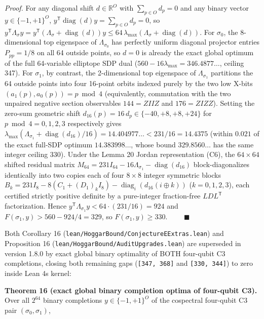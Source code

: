 \documentclass[11pt,a4paper]{article}
\newcommand{\lt}{<}
\newcommand{\gt}{>}
\begin{document}
\emph{Proof.} For any diagonal shift \(d\in\mathbb R^O\) with \(\sum_{p\in O} d_p = 0\) and any binary vector
\(y\in\{-1,+1\}^O\), \(y^{\mathsf T}\operatorname{diag}(d)y = \sum_{p\in O} d_p = 0\), so
\(y^{\mathsf T}\Lambda_\sigma y = y^{\mathsf T}(\Lambda_\sigma + \operatorname{diag}(d))y \le 64\,\lambda_{\max}(\Lambda_\sigma + \operatorname{diag}(d))\).
For \(\sigma_0\), the 8-dimensional top eigenspace of \(\Lambda_{\sigma_0}\) has perfectly uniform diagonal
projector entries \(P_{pp} = 1/8\) on all 64 outside points, so \(d=0\) is already the exact global optimum of
the full 64-variable elliptope SDP dual (\(560 - 16\lambda_{\max} = 346.4877\ldots\), ceiling 347). For
\(\sigma_1\), by contrast, the 2-dimensional top eigenspace of \(\Lambda_{\sigma_1}\) partitions the 64
outside points into four 16-point orbits indexed purely by the two low X-bits
\((a_1(p), a_0(p)) = p \bmod 4\) (equivalently, commutation with the two unpaired negative section
observables \(144 = ZIIZ\) and \(176 = ZIZZ\)). Setting the zero-sum geometric shift
\(d_{16}(p) = 16\,d_p \in \{-40, +8, +8, +24\}\) for \(p \bmod 4 = 0, 1, 2, 3\) respectively gives
\(\lambda_{\max}(\Lambda_{\sigma_1} + \operatorname{diag}(d_{16})/16) = 14.404977\ldots \lt 231/16 = 14.4375\)
(within \(0.021\) of the exact full-SDP optimum \(14.383998\ldots\), whose bound \(329.8560\ldots\) has the
same integer ceiling 330). Under the Lemma 20 Jordan representation (C6), the \(64\times 64\) shifted
residual matrix \(M_{64} = 231 I_{64} - 16\Lambda_{\sigma_1} - \operatorname{diag}(d_{16})\)
block-diagonalizes identically into two copies each of four \(8\times 8\) integer symmetric blocks
\(B_k = 231 I_8 - 8(C_1 + (D_1)_k I_8) - \operatorname{diag}_i(d_{16}(i \oplus k))\) (\(k=0,1,2,3\)), each
certified strictly positive definite by a pure-integer fraction-free \(LDL^{\mathsf T}\) factorization.
Hence \(y^{\mathsf T}\Lambda_{\sigma_1}y \lt 64 \cdot (231/16) = 924\) and
\(F(\sigma_1,y) \gt 560 - 924/4 = 329\), so \(F(\sigma_1,y) \ge 330\). \(\qquad\blacksquare\)

Both Corollary 16 (\nolinkurl{lean/HoggarBound/ConjectureEExtras.lean}) and Proposition 16\textquotesingle{}
(\nolinkurl{lean/HoggarBound/AuditUpgrades.lean}) are superseded in version 1.8.0 by exact global binary optimality
of BOTH four-qubit C3 completions, closing both remaining gaps (\texttt{{[}347,\ 368{]}} and \texttt{{[}330,\ 344{]}}) to zero
inside Lean 4\textquotesingle s kernel:

\textbf{Theorem 16\textquotesingle\textquotesingle{} (exact global binary completion optima of four-qubit C3).} Over all \(2^{64}\) binary
completions \(y \in \{-1, +1\}^O\) of the cospectral four-qubit C3 pair \((\sigma_0, \sigma_1)\),
\end{document}
